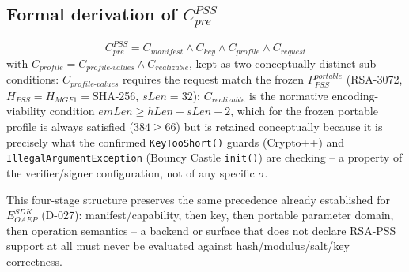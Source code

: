 \documentclass[11pt,a4paper]{article}
\begin{document}
\subsection{Formal derivation of \texorpdfstring{$C_{pre}^{PSS}$}{Cpre PSS}}\label{sec:pss-cpre}
\[C_{pre}^{PSS} = C_{manifest} \land C_{key} \land C_{profile} \land C_{request}\]
with $C_{profile} = C_{profile\text{-}values} \land C_{realizable}$, kept as two conceptually distinct sub-conditions: $C_{profile\text{-}values}$ requires the request match the frozen $P_{PSS}^{portable}$ (RSA-3072, $H_{PSS}=H_{MGF1}=$SHA-256, $sLen=32$); $C_{realizable}$ is the normative encoding-viability condition $emLen \ge hLen+sLen+2$, which for the frozen portable profile is always satisfied ($384 \ge 66$) but is retained conceptually because it is precisely what the confirmed \texttt{KeyTooShort()} guards (Crypto++) and \texttt{IllegalArgumentException} (Bouncy Castle \texttt{init()}) are checking -- a property of the verifier/signer configuration, not of any specific $\sigma$.

This four-stage structure preserves the same precedence already established for $E_{OAEP}^{SDK}$ (D-027): manifest/capability, then key, then portable parameter domain, then operation semantics -- a backend or surface that does not declare RSA-PSS support at all must never be evaluated against hash/modulus/salt/key correctness.
\end{document}
